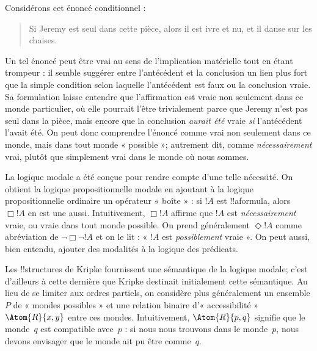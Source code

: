 \documentclass[../../../include/open-logic-section]{subfiles}
\begin{document}


Considérons cet énoncé conditionnel :
\begin{quote}
  Si Jeremy est seul dans cette pièce, alors il est ivre et nu,
  et il danse sur les chaises.
\end{quote}
Un tel énoncé peut être vrai au sens de l'implication matérielle
tout en étant trompeur : il semble suggérer entre l'antécédent et
la conclusion un lien plus fort que la simple condition selon
laquelle l'antécédent est faux ou la conclusion vraie. Sa
formulation laisse entendre que l'affirmation est vraie non
seulement dans ce monde particulier, où elle pourrait l'être
trivialement parce que Jeremy n'est pas seul dans la pièce,
mais encore que la conclusion \emph{aurait été} vraie
\emph{si} l'antécédent l'avait été. On peut donc comprendre
l'énoncé comme vrai non seulement dans ce monde, mais dans
tout monde « possible »; autrement dit, comme
\emph{nécessairement} vrai, plutôt que simplement vrai
dans le monde où nous sommes.

La logique modale a été conçue pour rendre compte d'une telle
nécessité. On obtient la logique propositionnelle modale en
ajoutant à la logique propositionnelle ordinaire un opérateur
« boîte » : si $!A$ est !!a{formula}, alors $\Box !A$ en est
une aussi. Intuitivement, $\Box !A$ affirme que $!A$ est
\emph{nécessairement} vraie, ou vraie dans tout monde possible.
On prend généralement $\Diamond !A$ comme abréviation de
$\lnot \Box \lnot !A$ et on le lit : « $!A$ est
\emph{possiblement} vraie ». On peut aussi, bien entendu,
ajouter des modalités à la logique des prédicats.

Les !!{structure}s de Kripke fournissent une sémantique de la
logique modale; c'est d'ailleurs à cette dernière que Kripke
destinait initialement cette sémantique. Au lieu de se limiter
aux ordres partiels, on considère plus généralement un ensemble
$P$ de « mondes possibles » et une relation binaire
d'« accessibilité » $\Atom{R}{x,y}$ entre ces mondes.
Intuitivement, $\Atom{R}{p,q}$ signifie que le monde~$q$
est compatible avec~$p$ : si nous nous trouvons dans le
monde~$p$, nous devons envisager que le monde ait pu
être comme~$q$.
\end{document}
